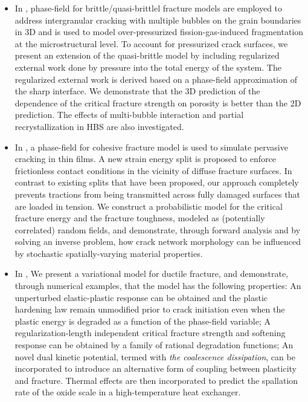 \begin{itemize}
  \item %
        In , phase-field for brittle/quasi-brittlel fracture models are employed to address intergranular cracking with multiple bubbles on the grain boundaries in 3D and is used to model over-pressurized fission-gas-induced fragmentation at the microstructural level. To account for pressurized crack surfaces, we present an extension of the quasi-brittle model by including regularized external work done by pressure into the total energy of the system. The regularized external work is derived based on a phase-field approximation of the sharp interface. We demonstrate that the 3D prediction of the dependence of the critical fracture strength on porosity is better than the 2D prediction. The effects of multi-bubble interaction and partial recrystallization in HBS are also investigated.
  \item %
        In , a phase-field for cohesive fracture model is used to simulate pervasive cracking in thin films. A new strain energy split is proposed to enforce frictionless contact conditions in the vicinity of diffuse fracture surfaces. In contrast to existing splits that have been proposed, our approach completely prevents tractions from being transmitted across fully damaged surfaces that are loaded in tension. We construct a probabilistic model for the critical fracture energy and the fracture toughness, modeled as (potentially correlated) random fields, and demonstrate, through forward analysis and by solving an inverse problem, how crack network morphology can be influenced by stochastic spatially-varying material properties.
  \item %
        In , We present a variational model for ductile fracture, and demonstrate, through numerical examples, that the model has the following properties: An unperturbed elastic-plastic response can be obtained and the plastic hardening law remain unmodified prior to crack initiation even when the plastic energy is degraded as a function of the phase-field variable; A regularization-length independent critical fracture strength and softening response can be obtained by a family of rational degradation functions; An novel dual kinetic potential, termed with \emph{the coalescence dissipation}, can be incorporated to introduce an alternative form of coupling between plasticity and fracture. Thermal effects are then incorporated to predict the spallation rate of the oxide scale in a high-temperature heat exchanger.
\end{itemize}
